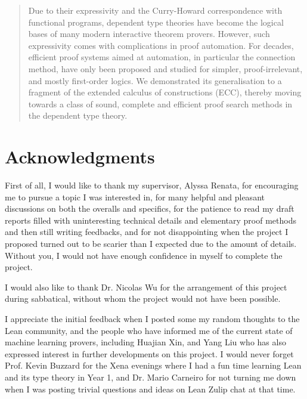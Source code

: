 \documentclass[twoside]{report}
\begin{document}


\begin{abstract}
Due to their expressivity and the Curry-Howard correspondence with functional programs, dependent type theories have become the logical bases of many modern interactive theorem provers. However, such expressivity comes with complications in proof automation. For decades, efficient proof systems aimed at automation, in particular the connection method, have only been proposed and studied for simpler, proof-irrelevant, and mostly first-order logics. We demonstrated its generalisation to a fragment of the extended calculus of constructions (ECC), thereby moving towards a class of sound, complete and efficient proof search methods in the dependent type theory.
\end{abstract}

\chapter*{Acknowledgments}
\label{sec:acknowledgements}
\thispagestyle{empty}

First of all, I would like to thank my supervisor, Alyssa Renata, for encouraging me to pursue a topic I was interested in, for many helpful and pleasant discussions on both the overalls and specifics, for the patience to read my draft reports filled with uninteresting technical details and elementary proof methods and then still writing feedbacks, and for not disappointing when the project I proposed turned out to be scarier than I expected due to the amount of details. Without you, I would not have enough confidence in myself to complete the project.

I would also like to thank Dr. Nicolas Wu for the arrangement of this project during sabbatical, without whom the project would not have been possible.

I appreciate the initial feedback when I posted some my random thoughts to the Lean community, and the people who have informed me of the current state of machine learning provers, including Huajian Xin, and Yang Liu who has also expressed interest in further developments on this project. I would never forget Prof. Kevin Buzzard for the Xena evenings where I had a fun time learning Lean and its type theory in Year 1, and Dr. Mario Carneiro for not turning me down when I was posting trivial questions and ideas on Lean Zulip chat at that time.
\end{document}
